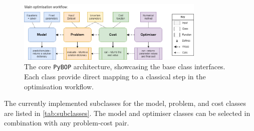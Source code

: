 \documentclass[
]{article}
\begin{document}
\begin{figure}
\centering
\includegraphics[width=0.8\textwidth,height=\textheight]{figures/PyBOP_components.drawio.png}
\caption{The core \texttt{PyBOP} architecture, showcasing the base class
interfaces. Each class provide direct mapping to a classical step in the
optimisation workflow. \label{fig:classes}}
\end{figure}

The currently implemented subclasses for the model, problem, and cost
classes are listed in \autoref{tab:subclasses}. The model and optimiser
classes can be selected in combination with any problem-cost pair.
\end{document}
